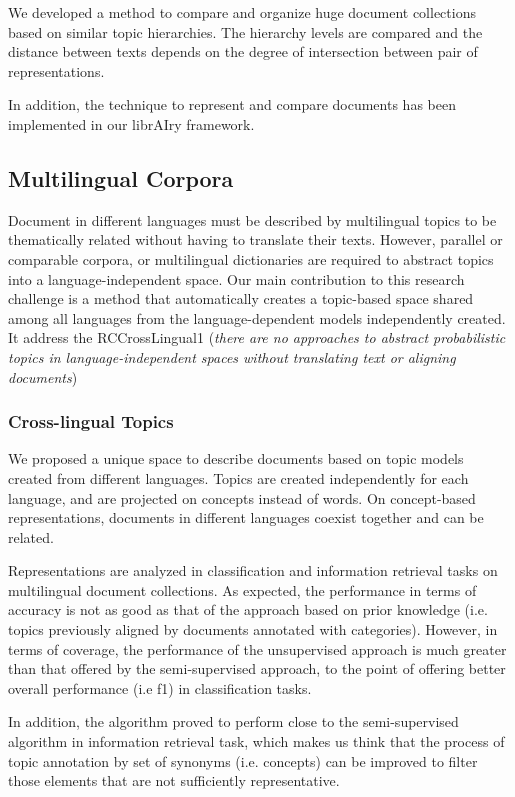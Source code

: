 We developed a method to compare and organize huge document collections based on similar topic hierarchies. The hierarchy levels are compared and the distance between texts depends on the degree of intersection between pair of representations.

In addition, the technique to represent and compare documents has been implemented in our librAIry framework.

\subsection{Multilingual Corpora}

Document in different languages must be described by multilingual topics to be thematically related without having to translate their texts. However, parallel or comparable corpora, or multilingual dictionaries are required to abstract topics into a language-independent space. Our main contribution to this research challenge is a method that automatically creates a topic-based space shared among all languages from the language-dependent models independently created. It address the RCCrossLingual1 (\textit{there are no approaches to abstract probabilistic topics in language-independent spaces without translating text or aligning documents}) 

\subsubsection{Cross-lingual Topics}

We proposed a unique space to describe documents based on topic models created from different languages. Topics are created independently for each language, and are projected on concepts instead of words. On concept-based representations, documents in different languages coexist together and can be related.

Representations are analyzed in classification and information retrieval tasks on multilingual document collections. As expected, the performance in terms of accuracy is not as good as that of the approach based on prior knowledge (i.e. topics previously aligned by documents annotated with categories). However, in terms of coverage, the performance of the unsupervised approach is much greater than that offered by the semi-supervised approach, to the point of offering better overall performance (i.e f1) in classification tasks. 

In addition, the algorithm proved to perform close to the semi-supervised algorithm in information retrieval task, which makes us think that the process of topic annotation by set of synonyms (i.e. concepts) can be improved to filter those elements that are not sufficiently representative.


